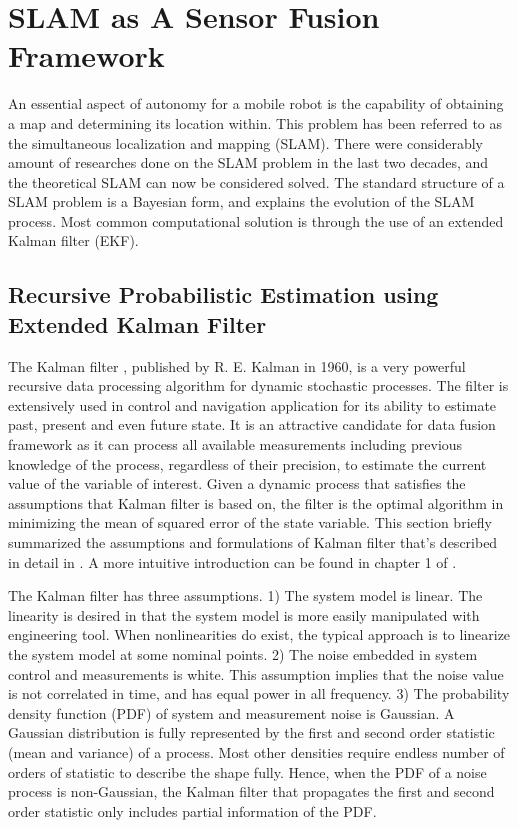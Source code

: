 \section{SLAM as A Sensor Fusion Framework}
\label{sec:SLAM}
An essential aspect of autonomy for a mobile robot is the capability
of obtaining a map and determining its location within. This problem
has been referred to as the simultaneous localization and mapping
(SLAM). There were considerably amount of researches done on the SLAM
problem in the last two decades, and the theoretical SLAM can now be
considered solved. The standard structure of a SLAM problem is a
Bayesian form, and explains the evolution of the SLAM process. Most
common computational solution is through the use of an extended
Kalman filter (EKF).

\subsection{Recursive Probabilistic Estimation using Extended Kalman Filter}
\label{sec:SLAM_using_EKF}

The Kalman filter \cite{kalman_new_1960}, published by R. E. Kalman in
1960, is a very powerful recursive data processing algorithm for
dynamic stochastic processes. The filter is extensively used in
control and navigation application for its ability to estimate past,
present and even future state. It is an attractive candidate for data
fusion framework as it can process all available measurements
including previous knowledge of the process, regardless of their
precision, to estimate the current value of the variable of interest.
Given a dynamic process that satisfies the assumptions that Kalman
filter is based on, the filter is the optimal algorithm in minimizing
the mean of squared error of the state variable. This section briefly
summarized the assumptions and formulations of Kalman filter that's
described in detail in \cite{sorenson_least-squares_1970}
\cite{analytic_sciences_corporation_applied_1974}
\cite{grewal_kalman_1993} \cite{lewis_optimal_1986}
\cite{brown_introduction_1993}. A more intuitive introduction can be
found in chapter 1 of \cite{maybeck_stochastic_1979}.


The Kalman filter has three assumptions. 1) The system model is
linear. The linearity is desired in that the system model is more
easily manipulated with engineering tool. When nonlinearities do
exist, the typical approach is to linearize the system model at some
nominal points. 2) The noise embedded in system control and
measurements is white. This assumption implies that the noise value is
not correlated in time, and has equal power in all frequency. 3) The
probability density function (PDF) of system and measurement noise is
Gaussian. A Gaussian distribution is fully represented by the first
and second order statistic (mean and variance) of a process. Most
other densities require endless number of orders of statistic to
describe the shape fully. Hence, when the PDF of a noise process is
non-Gaussian, the Kalman filter that propagates the first and second
order statistic only includes partial information of the PDF.

